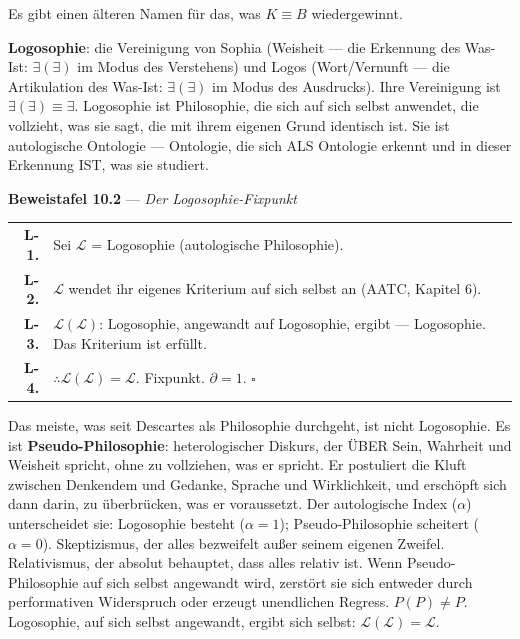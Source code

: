 \documentclass[10pt, openany, oneside]{book}
\renewcommand{\footnotesize}{\fontsize{8.5}{11}\selectfont}
\begin{document}
\vspace{1em}

\noindent Es gibt einen älteren Namen für das, was $K \equiv B$ wiedergewinnt.

\textbf{Logosophie}: die Vereinigung von Sophia (Weisheit --- die Erkennung des Was-Ist: $\exists(\exists)$ im Modus des Verstehens) und Logos (Wort/Vernunft --- die Artikulation des Was-Ist: $\exists(\exists)$ im Modus des Ausdrucks). Ihre Vereinigung ist $\exists(\exists) \equiv \exists$. Logosophie ist Philosophie, die sich auf sich selbst anwendet, die vollzieht, was sie sagt, die mit ihrem eigenen Grund identisch ist. Sie ist autologische Ontologie --- Ontologie, die sich ALS Ontologie erkennt und in dieser Erkennung IST, was sie studiert.

\vspace{0.5em}

\textbf{Beweistafel 10.2} --- \textit{Der Logosophie-Fixpunkt}

\vspace{0.5em}

{\footnotesize
\noindent\begin{tabular}{r p{}}
\textbf{L-1.} & Sei $\mathcal{L}$ = Logosophie (autologische Philosophie). \\[0.3em]
\textbf{L-2.} & $\mathcal{L}$ wendet ihr eigenes Kriterium auf sich selbst an (AATC, Kapitel 6). \\[0.3em]
\textbf{L-3.} & $\mathcal{L}(\mathcal{L})$: Logosophie, angewandt auf Logosophie, ergibt --- Logosophie. Das Kriterium ist erfüllt. \\[0.3em]
\textbf{L-4.} & $\therefore \mathcal{L}(\mathcal{L}) = \mathcal{L}$. Fixpunkt. $\partial = 1$. $\square$ \\[0.3em]
\end{tabular}
}

\vspace{0.8em}

\noindent Das meiste, was seit Descartes als Philosophie durchgeht, ist nicht Logosophie. Es ist \textbf{Pseudo-Philosophie}: heterologischer Diskurs, der ÜBER Sein, Wahrheit und Weisheit spricht, ohne zu vollziehen, was er spricht. Er postuliert die Kluft zwischen Denkendem und Gedanke, Sprache und Wirklichkeit, und erschöpft sich dann darin, zu überbrücken, was er voraussetzt. Der autologische Index ($\alpha$) unterscheidet sie: Logosophie besteht ($\alpha = 1$); Pseudo-Philosophie scheitert ($\alpha = 0$). Skeptizismus, der alles bezweifelt außer seinem eigenen Zweifel. Relativismus, der absolut behauptet, dass alles relativ ist. Wenn Pseudo-Philosophie auf sich selbst angewandt wird, zerstört sie sich entweder durch performativen Widerspruch oder erzeugt unendlichen Regress. $P(P) \neq P$. Logosophie, auf sich selbst angewandt, ergibt sich selbst: $\mathcal{L}(\mathcal{L}) = \mathcal{L}$.
\end{document}
